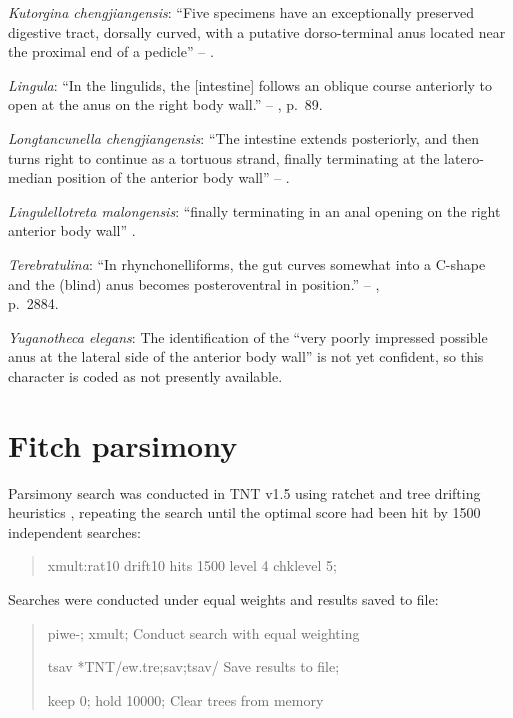 \documentclass[]{book}
\theoremstyle{definition}
\theoremstyle{definition}
\theoremstyle{definition}
\theoremstyle{remark}
\begin{document}
\emph{Kutorgina chengjiangensis}: ``Five specimens have an exceptionally
preserved digestive tract, dorsally curved, with a putative
dorso-terminal anus located near the proximal end of a pedicle'' --
\citet{Zhang2007Rhynchonelliformeanbrachiopods}.

\emph{Lingula}: ``In the lingulids, the {[}intestine{]} follows an
oblique course anteriorly to open at the anus on the right body wall.''
-- \citet{Williams1997BrachiopodaRevised}, p.~89.

\emph{Longtancunella chengjiangensis}: ``The intestine extends
posteriorly, and then turns right to continue as a tortuous strand,
finally terminating at the latero-median position of the anterior body
wall'' -- \citet{Zhang2007Agregarious}.

\emph{Lingulellotreta malongensis}: ``finally terminating in an anal
opening on the right anterior body wall'' \citep[p.66]{Zhang2007Noteon}.

\emph{Terebratulina}: ``In rhynchonelliforms, the gut curves somewhat
into a C-shape and the (blind) anus becomes posteroventral in
position.'' -- \citet{Williams2007PartH},\\
p.~2884.

\emph{Yuganotheca elegans}: The identification of the ``very poorly
impressed possible anus at the lateral side of the anterior body wall''
is not yet confident, so this character is coded as not presently
available.

\hypertarget{fitch}{%
\chapter{Fitch parsimony}\label{fitch}}

Parsimony search was conducted in TNT v1.5 \citep{Goloboff2016} using
ratchet and tree drifting heuristics \citep{Goloboff1999, Nixon1999},
repeating the search until the optimal score had been hit by 1500
independent searches:

\begin{quote}
xmult:rat10 drift10 hits 1500 level 4 chklevel 5;
\end{quote}

Searches were conducted under equal weights and results saved to file:

\begin{quote}
piwe-; xmult; {Conduct search with equal weighting}

tsav *TNT/ew.tre;sav;tsav/ {Save results to file};

keep 0; hold 10000; {Clear trees from memory}
\end{quote}
\end{document}
